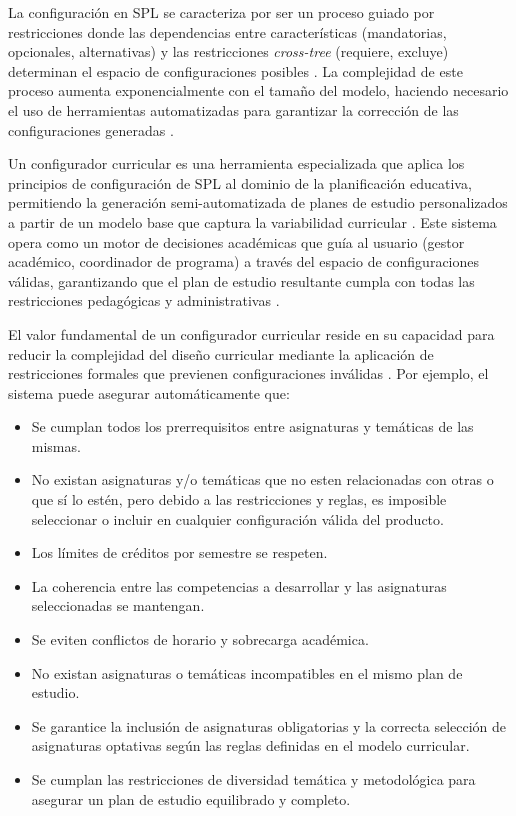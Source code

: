 La configuración en \ac{SPL} se caracteriza por ser un proceso guiado por
restricciones donde las dependencias entre características (mandatorias,
opcionales, alternativas) y las restricciones \textit{cross-tree} (requiere, excluye)
determinan el espacio de configuraciones posibles \citep{chen2020variability}. La
complejidad de este proceso aumenta exponencialmente con el tamaño del
modelo, haciendo necesario el uso de herramientas automatizadas para garantizar 
la corrección de las configuraciones generadas \citep{benavides2010automated}.

Un configurador curricular es una herramienta especializada que aplica los
principios de configuración de \ac{SPL} al dominio de la planificación educativa, permitiendo 
la generación semi-automatizada de planes de estudio
personalizados a partir de un modelo base que captura la variabilidad curricular
\citep{sanchez2020metodologia}. Este sistema opera como un motor de decisiones
académicas que guía al usuario (gestor académico, coordinador de programa)
a través del espacio de configuraciones válidas, garantizando que el plan de
estudio resultante cumpla con todas las restricciones pedagógicas y
administrativas \citep{chen2020variability}.

El valor fundamental de un configurador curricular reside en su capacidad para
reducir la complejidad del diseño curricular mediante la aplicación de
restricciones formales que previenen configuraciones inválidas \citep{rodriguez2019gestion_curricular}. 
Por ejemplo, el sistema puede asegurar automáticamente que:

\begin{itemize}
    \item Se cumplan todos los prerrequisitos entre asignaturas y temáticas de las mismas.
    \item No existan asignaturas y/o temáticas que no esten relacionadas con otras o que sí 
    lo estén, pero debido a las restricciones y reglas, es imposible seleccionar o incluir
    en cualquier configuración válida del producto.
    \item Los límites de créditos por semestre se respeten.
    \item La coherencia entre las competencias a desarrollar y las asignaturas seleccionadas se mantengan.
    \item Se eviten conflictos de horario y sobrecarga académica.
    \item No existan asignaturas o temáticas incompatibles en el mismo plan de estudio.
    \item Se garantice la inclusión de asignaturas obligatorias y la correcta selección de asignaturas optativas según las reglas definidas en el modelo curricular.
    \item Se cumplan las restricciones de diversidad temática y metodológica para asegurar un plan de estudio equilibrado y completo.
\end{itemize}
            
